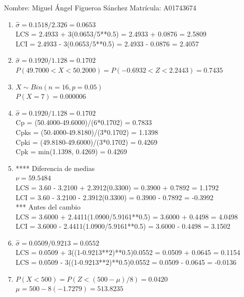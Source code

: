 \documentclass[8pt]{report}
\begin{document}
 \newpage

Nombre: \underline{\hspace*{.2in}}
Miguel Ángel Figueroa Sánchez
\underline{\hspace*{.2in}} \quad Matr\'icula:\underline{\hspace*{.2in}}
A01743674
\underline{\hspace*{.2in}} \\

\begin{enumerate}
\item $\hat\sigma = 0.1518/2.326 = 0.0653$\\
LCS = 2.4933 + 3(0.0653/5**0.5) = 2.4933 + 0.0876 = 2.5809\\
LCI = 2.4933 - 3(0.0653/5**0.5) = 2.4933 - 0.0876 = 2.4057
\item $\hat\sigma = 0.1920/1.128 = 0.1702$\\
$P(49.7000 < X < 50.2000) = P(-0.6932 < Z < 2.2443) = 0.7435$\\
\item $X \sim Bin(n=16, p=0.05)$\\
$P(X = 7) = 0.000006$
\item $\hat\sigma = 0.1920/1.128 = 0.1702$\\
Cp = (50.4000-49.6000)/(6*0.1702) = 0.7833\\
Cpks = (50.4000-49.8180)/(3*0.1702) = 1.1398\\
Cpki = (49.8180-49.6000)/(3*0.1702) = 0.4269\\
Cpk = min(1.1398, 0.4269) = 0.4269
\item **** Diferencia de medias\\
$\nu = 59.5484$\\
LCS = 3.60 - 3.2100 + 2.3912(0.3300) = 0.3900 + 0.7892 = 1.1792\\
LCI = 3.60 - 3.2100 - 2.3912(0.3300) = 0.3900 - 0.7892 = -0.3992\\
*** Antes del cambio\\
LCS = 3.6000 + 2.4411(1.0900/5.9161**0.5) = 3.6000 + 0.4498 = 4.0498\\
LCI = 3.6000 - 2.4411(1.0900/5.9161**0.5) = 3.6000 - 0.4498 = 3.1502\\
\item $\hat\sigma = 0.0509/0.9213 = 0.0552$\\
LCS = 0.0509 + 3((1-0.9213**2)**0.5)0.0552 = 0.0509 + 0.0645 = 0.1154\\
LCS = 0.0509 - 3((1-0.9213**2)**0.5)0.0552 = 0.0509 - 0.0645 = -0.0136
\item $P(X < 500) = P(Z < (500-\mu)/8) = 0.0420$\\
$\mu = 500 - 8(-1.7279) = 513.8235$\\
\end{enumerate}
\end{document}
